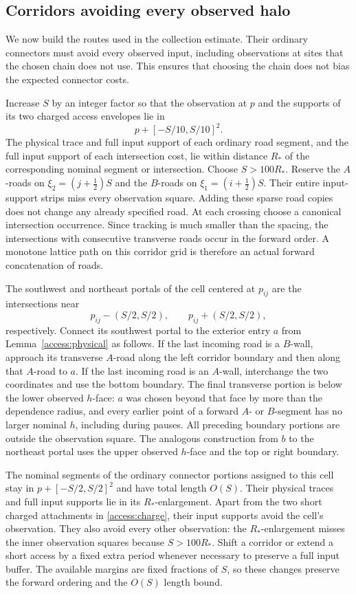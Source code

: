 \subsection{Corridors avoiding every observed halo}

We now build the routes used in the collection estimate.  Their ordinary
connectors must avoid every observed input, including observations at
sites that the chosen chain does not use.  This ensures that choosing the
chain does not bias the expected connector costs.

Increase $S$ by an integer factor so that the observation at $p$ and the
supports of its two charged access envelopes lie in
\[
                     p+[-S/10,S/10]^2.
\]
The physical trace and full input support of each ordinary road segment,
and the full input support of each intersection cost, lie within distance
$R_*$ of the corresponding nominal segment or intersection.
Choose
$S>100R_*$.  Reserve the $A$-roads on
$\xi_2=(j+\tfrac12)S$ and the $B$-roads on
$\xi_1=(i+\tfrac12)S$.  Their entire input-support strips miss every
observation square.  Adding these sparse road copies does not change
any already specified road.  At each crossing choose a canonical
intersection occurrence.  Since tracking is much smaller than the
spacing, the intersections with consecutive transverse roads occur in
the forward order.  A monotone lattice path on this corridor grid is
therefore an actual forward concatenation of roads.

The southwest and northeast portals of the cell centered at $p_{ij}$
are the intersections near
\[
       p_{ij}-(S/2,S/2),\qquad p_{ij}+(S/2,S/2),
\]
respectively.  Connect its southwest portal to the exterior entry $a$
from Lemma~\ref{access:physical} as follows.  If the last incoming road is
a $B$-wall, approach its transverse $A$-road along the left corridor
boundary and then along that $A$-road to $a$.  If the last incoming road
is an $A$-wall, interchange the two coordinates and use the bottom
boundary.  The final transverse portion is below the lower observed
$h$-face: $a$ was chosen beyond that face by more than the dependence
radius, and every earlier point of a forward $A$- or $B$-segment has
no larger nominal $h$, including during pauses. All preceding boundary portions are outside the
observation square.  The analogous construction from $b$ to the northeast
portal uses the upper observed $h$-face and the top or right boundary.

The nominal segments of the ordinary connector portions assigned to this
cell stay in $p+[-S/2,S/2]^2$ and have total length $O(S)$. Their physical
traces and full input supports lie in its $R_*$-enlargement. Apart from the two short charged
attachments in \eqref{access:charge}, their input supports avoid the
cell's observation. They also avoid every other observation: the
$R_*$-enlargement misses the inner observation squares because
$S>100R_*$. Shift a corridor or extend a short access
by a fixed extra period whenever necessary to preserve a full input
buffer.  The available margins are fixed fractions of $S$, so these
changes preserve the forward ordering and the $O(S)$ length bound.

